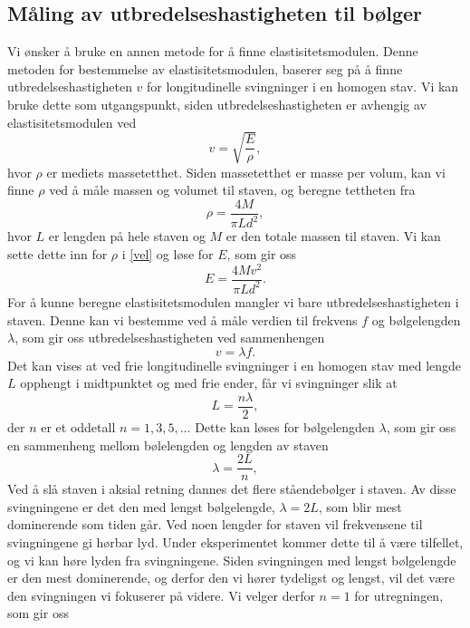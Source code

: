 \documentclass[%
 reprint,
 amsmath,amssymb,
 aps,
 norsk,
 booktabs
]{revtex4-1}
\begin{document}
\subsection{Måling av utbredelseshastigheten til bølger}\label{teori-b}
Vi ønsker å bruke en annen metode for å finne elastisitetsmodulen. Denne metoden for bestemmelse av elastisitetsmodulen, baserer seg på å finne utbredelseshastigheten $v$ for longitudinelle svingninger i en homogen stav. Vi kan bruke dette som utgangspunkt, siden utbredelseshastigheten er avhengig av elastisitetsmodulen ved
\begin{equation}
  v = \sqrt{\frac{E}{\rho}},\label{vel}
\end{equation}
hvor $\rho$ er mediets massetetthet. Siden massetetthet er masse per volum, kan vi finne $\rho$ ved å måle massen og volumet til staven, og beregne tettheten fra
\begin{equation*}
  \rho = \frac{4M}{\pi L d^2},
\end{equation*}
hvor $L$ er lengden på hele staven og $M$ er den totale massen til staven. Vi kan sette dette inn for $\rho$ i \eqref{vel} og løse for $E$, som gir oss
\begin{equation}
  E = \frac{4Mv^2}{\pi L d^2}.\label{elast}
\end{equation}
For å kunne beregne elastisitetsmodulen mangler vi bare utbredelseshastigheten i staven. Denne kan vi bestemme ved å måle verdien til frekvens $f$ og bølgelengden $\lambda$, som gir oss utbredelseshastigheten ved sammenhengen
\begin{equation}
  v = \lambda f.\label{vlf}
\end{equation}
Det kan vises \cite{oppgave} at ved frie longitudinelle svingninger i en homogen stav med lengde $L$ opphengt i midtpunktet og med frie ender, får vi svingninger slik at
\begin{equation*}
  L = \frac{n\lambda}{2},
\end{equation*}
der $n$ er et oddetall $n = 1, 3, 5, \ldots$ Dette kan løses for bølgelengden $\lambda$, som gir oss en sammenheng mellom bølelengden og lengden av staven
\begin{equation*}
  \lambda = \frac{2L}{n},
\end{equation*}
Ved å slå staven i aksial retning dannes det flere ståendebølger i staven. Av disse svingningene er det den med lengst bølgelengde, $\lambda = 2L$, som blir mest dominerende som tiden går. Ved noen lengder for staven vil frekvensene til svingningene gi hørbar lyd. Under eksperimentet kommer dette til å være tilfellet, og vi kan høre lyden fra svingningene. Siden svingningen med lengst bølgelengde er den mest dominerende, og derfor den vi hører tydeligst og lengst, vil det være den svingningen vi fokuserer på videre. Vi velger derfor $n=1$ for utregningen, som gir oss
\end{document}
